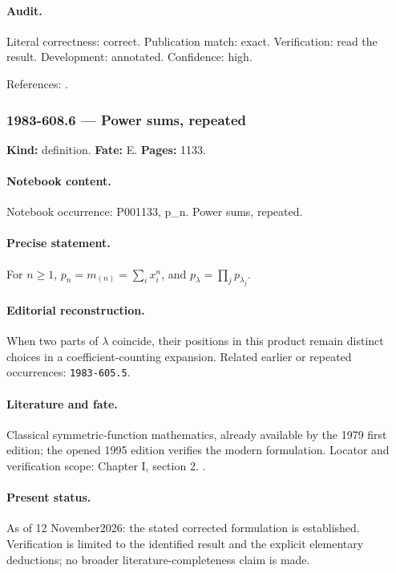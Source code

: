 \paragraph{Audit.} Literal correctness: correct. Publication match: exact. Verification: read the result. Development: annotated. Confidence: high.

\noindent References: \citep{macdonald1995symmetric}.\par

\subsubsection{1983-608.6 --- Power sums, repeated}

\label{item:1983-608.6}

\noindent\textbf{Kind:} definition. \textbf{Fate:} E. \textbf{Pages:} 1133.\par

\paragraph{Notebook content.} Notebook occurrence: P001133, p_n. Power sums, repeated.

\paragraph{Precise statement.} For \(n\ge1\), \(p_n=m_{(n)}=\sum_i x_i^n\), and \(p_\lambda=\prod_jp_{\lambda_j}\).

\paragraph{Editorial reconstruction.} When two parts of \(\lambda\) coincide, their positions in this product remain distinct choices in a coefficient-counting expansion. Related earlier or repeated occurrences: \texttt{1983-605.5}.

\paragraph{Literature and fate.} Classical symmetric-function mathematics, already available by the 1979 first edition; the opened 1995 edition verifies the modern formulation. Locator and verification scope: Chapter I, section 2. \cite{macdonald1995symmetric}.

\paragraph{Present status.} As of 12 November2026: the stated corrected formulation is established. Verification is limited to the identified result and the explicit elementary deductions; no broader literature-completeness claim is made.

